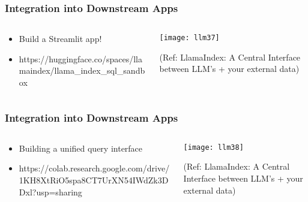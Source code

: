 \begin{frame}[fragile]\frametitle{Integration into Downstream Apps}

\begin{columns}
    \begin{column}[T]{0.4\linewidth}
		\begin{itemize}
		\item Build a Streamlit app! 
		\item https://huggingface.co/spaces/llamaindex/llama\_index\_sql\_sandbox
		\end{itemize}	
    \end{column}
    \begin{column}[T]{0.6\linewidth}
		\begin{center}
		\texttt{[image: llm37]}

		{\tiny (Ref: LlamaIndex: A Central Interface between LLM’s + your external data)}
		\end{center}
    \end{column}
  \end{columns}
\end{frame}

\begin{frame}[fragile]\frametitle{Integration into Downstream Apps}

\begin{columns}
    \begin{column}[T]{0.4\linewidth}
		\begin{itemize}
		\item Building a unified query interface
		\item https://colab.research.google.com/drive/
		1KH8XtRiO5spa8CT7UrXN54IWdZk3DDxl?usp=sharing
		\end{itemize}	
    \end{column}
    \begin{column}[T]{0.6\linewidth}
		\begin{center}
		\texttt{[image: llm38]}

		{\tiny (Ref: LlamaIndex: A Central Interface between LLM’s + your external data)}
		\end{center}
    \end{column}
  \end{columns}
\end{frame}


